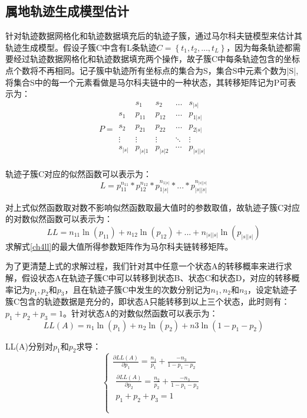 \subsection{属地轨迹生成模型估计}
针对轨迹数据网格化和轨迹数据填充后的轨迹子簇，通过马尔科夫链模型来估计其轨迹生成模型。假设子簇C中含有L条轨迹$C=\left\{ t_1,t_2,...,t_L \right\} $，因为每条轨迹都需要经过轨迹数据网格化和轨迹数据填充两个操作，故子簇C中每条轨迹包含的坐标点个数将不再相同。记子簇中轨迹所有坐标点的集合为S，集合S中元素个数为|S|,将集合S中的每一个元素看做是马尔科夫链中的一种状态，其转移矩阵记为P可表示为：
\begin{equation}
\label{transitionmatrix}
P=\begin{array}{c|cccc}
	&		s_1&		s_2&		\dots&		s_{|s|}\\
	\hline
	s_1&		p_{11}&		p_{12}&		\dots&		p_{1|s|}\\
	s_2&		p_{21}&		p_{22}&		\dots&		p_{2|s|}\\
	\vdots&		\vdots&		\vdots&		\ddots&		\vdots\\
	s_{|s|}&		p_{|s|1}&		p_{|s|2}&		\cdots&		p_{|s||s|}\\
\end{array}
\end{equation}

轨迹子簇C对应的似然函数可以表示为：
\[
L=p_{11}^{n_{11}}*p_{12}^{n_{12}}*p_{1|s|}^{n_{1|s|}}*...*p_{|s||s|}^{n_{|s||s|}}
\]

对上式似然函数取对数不影响似然函数取最大值时的参数取值，故轨迹子簇C对应的对数似然函数可以表示为：
\begin{equation}
\label{ch4ll}
LL=n_{11}\ln \left( p_{11} \right) +n_{12}\ln \left( p_{12} \right) +...+n_{|s||s|}\ln \left( p_{|s||s|} \right) 
\end{equation}
求解式\ref{ch4ll}的最大值所得参数矩阵作为马尔科夫链转移矩阵。

为了更清楚上式的求解过程，我们针对其中任意一个状态A的转移概率来进行求解，假设状态A在轨迹子簇C中可以转移到状态B、状态C和状态D，对应的转移概率记为$p_1,p_2和p_3$，且在轨迹子簇C中发生的次数分别记为$n_1,n_2和n_3$，设定轨迹子簇C包含的轨迹数据是充分的，即状态A只能转移到以上三个状态，此时则有：$p_1+p_2+p_3=1$。针对状态A的对数似然函数可以表示为：
\[
LL\left( A \right) =n_1\ln \left( p_1 \right) +n_2\ln \left( p_2 \right) +n3\ln \left( 1-p_1-p_2 \right) 
\]

LL(A)分别对$p_1$和$p_2$求导：
\[
\begin{cases}
	\frac{\partial LL\left( A \right)}{\partial p_1}=\frac{n_1}{p_1}+\frac{-n_3}{1-p_1-p_2}\\
	\begin{array}{c}
	\frac{\partial LL\left( A \right)}{\partial p_2}=\frac{n_2}{p_2}+\frac{-n_3}{1-p_1-p_2}\\
	p_1+p_2+p_3=1\\
\end{array}\\
\end{cases}
\]

